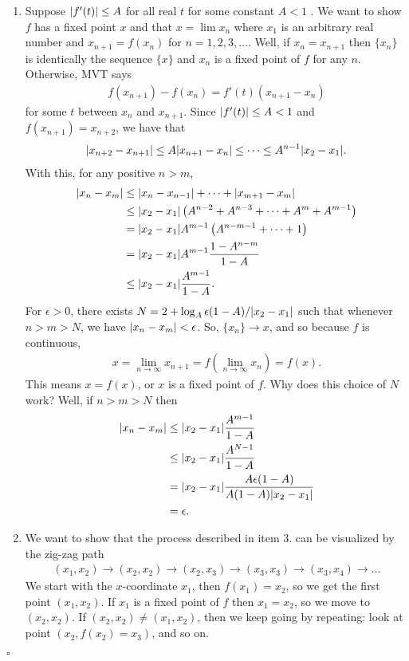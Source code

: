 \documentclass[11pt]{article}
\begin{document}
\begin{enumerate}
	\item Suppose $\abs{f'(t)} \leq A$ for all real $t$ for some constant $A<1$ . We want to show $f$ has a fixed point $x$ and that $x = \lim x_n$ where $x_1$ is an arbitrary real number and $x_{n+1} = f(x_n)$ for $n=1,2,3,\dots$. Well, if $x_{n} = x_{n+1}$ then $\{ x_n\}$ is identically the sequence $\{ x\}$ and $x_n$ is a fixed point of $f$ for any $n$. Otherwise, MVT says
	\begin{align*}
	f(x_{n+1}) - f(x_n) = f'(t)(x_{n+1} - x_n)
	\end{align*} 
	for some $t$ between $x_n$ and $x_{n+1}$. Since $\abs{f'(t)} \leq A < 1$ and $f(x_{n+1}) = x_{n+2}$, we have that
	\begin{align*}
	\abs{x_{n+2} - x_{n+1}} \leq A \abs{x_{n+1} - x_n}  \leq \dots \leq A^{n-1}\abs{x_2 - x_1}.
	\end{align*}
	With this, for any positive $n>m$, 
	\begin{align*}
	\abs{x_n - x_m} &\leq \abs{x_n - x_{n-1}} + \dots + \abs{x_{m+1} - x_m}\\
	&\leq \abs{x_2 - x_1} \left( A^{n-2} + A^{n-3} + \dots + A^{m} + A^{m-1} \right)\\
	&= \abs{x_2 - x_1}A^{m-1}\left( A^{n-m-1} +\dots + 1 \right)\\
	&= \abs{x_2 - x_1}A^{m-1}\frac{1- A^{n-m}}{1-A}\\
	&\leq \abs{x_2  - x_1} \frac{A^{m-1}}{1-A}.
	\end{align*}
	For $\epsilon > 0$, there exists $N = 2 + \log_A \epsilon(1-A)/\abs{x_2 - x_1}$ such that whenever $n> m > N $, we have $\abs{x_n - x_m} < \epsilon$. So, $\{x_n\} \to x$, and so because $f$ is continuous,
	\begin{align*}
	x = \lim_{n\to \infty} x_{n+1} = f\left( \lim_{n\to \infty} x_n\right) = f(x).
	\end{align*} 
	This means $x = f(x)$, or $x$ is a fixed point of $f$. Why does this choice of $N$ work? Well, if $n > m > N$ then 
	\begin{align*}
	\abs{x_n - x_m} &\leq \abs{x_2 - x_1}\frac{A^{m-1}}{1-A}\\
	&\leq \abs{x_2 - x_1}\frac{A^{N-1}}{1-A}\\
	&= \abs{x_2 - x_1}\frac{A\epsilon(1-A)}{A(1-A)\abs{x_2 - x_1}} \\
	&= \epsilon.
	\end{align*}
	
	
	\item We want to show that the process described in item 3. can be visualized by the zig-zag path
	\begin{align*}
	(x_1,x_2) \to (x_2,x_2) \to (x_2,x_3) \to (x_3,x_3) \to (x_3,x_4) \to \dots
	\end{align*}
	We start with the $x$-coordinate $x_1$, then $f(x_1) = x_2$, so we get the first point $(x_1,x_2)$. If $x_1$ is a fixed point of $f$ then $x_1 = x_2$, so we move to $(x_2,x_2)$. If $(x_2,x_2) \neq (x_1,x_2)$, then we keep going by repeating: look at point $(x_2, f(x_2) = x_3)$, and so on.
	
	
	
	
	
\end{enumerate}



\hfill $\square$

  
\end{document}
